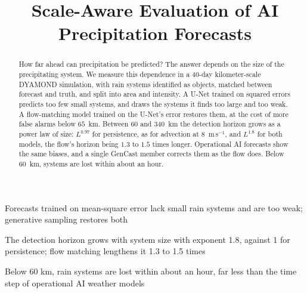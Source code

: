 \documentclass[draft]{agujournal2019}
\begin{document}
\title{Scale-Aware Evaluation of AI Precipitation Forecasts}


\begin{keypoints}
\item Forecasts trained on mean-square error lack small rain systems and are
too weak; generative sampling restores both
\item The detection horizon grows with system size with exponent 1.8,
against 1 for persistence; flow matching lengthens it 1.3 to 1.5 times
\item Below 60 km, rain systems are lost within about an hour, far less than
the time step of operational AI weather models
\end{keypoints}

\begin{abstract}
How far ahead can precipitation be predicted? The answer depends on the
size of the precipitating system. We measure this dependence in a 40-day
kilometer-scale DYAMOND simulation, with rain systems identified as
objects, matched between forecast and truth, and split into area and
intensity. A U-Net trained on squared errors predicts too few small
systems, and draws the systems it finds too large and too weak. A
flow-matching model trained on the U-Net's error restores them, at the
cost of more false alarms below $65$~km. Between $60$ and $340$~km the
detection horizon grows as a power law of size: $L^{0.97}$ for
persistence, as for advection at $8$~m\,s$^{-1}$, and $L^{1.8}$ for both
models, the flow's horizon being $1.3$ to $1.5$ times longer. Operational
AI forecasts show the same biases, and a single GenCast member corrects
them as the flow does. Below $60$~km, systems are lost within about an
hour.
\end{abstract}
\end{document}
